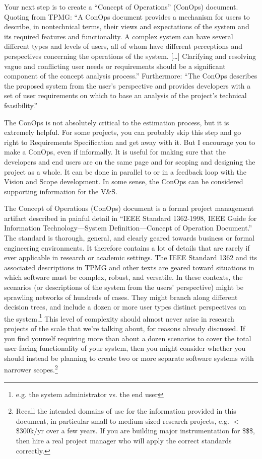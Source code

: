 \documentclass[12pt,oneside]{book}
\begin{document}
Your next step is to create a ``Concept of Operations'' (ConOps) document. Quoting from TPMG: ``A ConOps document provides a mechanism for users to describe, in nontechnical terms, their views and expectations of the system and its required features and functionality. A complex system can have several different types and levels of users, all of whom have different perceptions and perspectives concerning the operations of the system. [{\ldots}] Clarifying and resolving vague and conflicting user needs or requirements should be a significant component of the concept analysis process.'' Furthermore: ``The ConOps describes the proposed system from the user's perspective and provides developers with a set of user requirements on which to base an analysis of the project's technical feasibility.''

The ConOps is not absolutely critical to the estimation process, but it is extremely helpful. For some projects, you can probably skip this step and go right to Requirements Specification and get away with it. But I encourage you to make a ConOps, even if informally. It is useful for making sure that the developers and end users are on the same page and for scoping and designing the project as a whole. It can be done in parallel to or in a feedback loop with the Vision and Scope development. In some sense, the ConOps can be considered supporting information for the V\&S.

The Concept of Operations (ConOps) document is a formal project management artifact described in painful detail in ``IEEE Standard 1362-1998, IEEE Guide for Information Technology---System Definition---Concept of Operation Document.'' The standard is thorough, general, and clearly geared towards business or formal engineering environments. It therefore contains a lot of details that are rarely if ever applicable in research or academic settings. The IEEE Standard 1362 and its associated descriptions in TPMG and other texts are geared toward situations in which software must be complex, robust, and versatile. In these contexts, the scenarios (or descriptions of the system from the users' perspective) might be sprawling networks of hundreds of cases. They might branch along different decision trees, and include a dozen or more user types distinct perspectives on the system.\footnote{e.g. the system administrator vs. the end user} This level of complexity should almost never arise in research projects of the scale that we're talking about, for reasons already discussed. If you find yourself requiring more than about a dozen scenarios to cover the total user-facing functionality of your system, then you might consider whether you should instead be planning to create two or more separate software systems with narrower scopes.\footnote{Recall the intended domains of use for the information provided in this document, in particular small to medium-sized research projects, e.g. $<$\$300k/yr over a few years. If you are building major instrumentation for \$\$\$, then hire a real project manager who will apply the correct standards correctly.}
\end{document}
